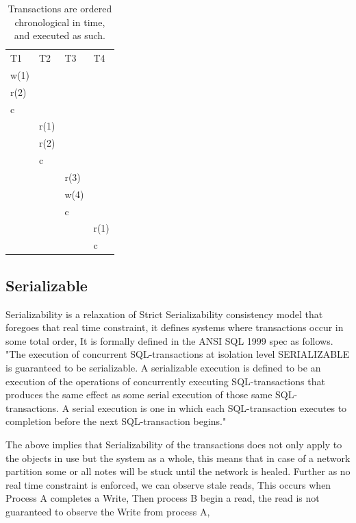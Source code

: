 \documentclass[a4paper,10pt,titlepage]{report}
\begin{document}
\begin{table}[h]
\begin{tabular}{l|l|l|l}
T1   & T2   & T3   & T4   \\
w(1) &      &      &      \\
r(2) &      &      &      \\
c    &      &      &      \\
     & r(1) &      &      \\
     & r(2) &      &      \\
     & c    &      &      \\
     &      & r(3) &      \\
     &      & w(4) &      \\
     &      & c    &      \\
     &      &      & r(1) \\
     &      &      & c   
\end{tabular}
\caption{Transactions are ordered chronological in time, and executed as such.}

\end{table}

\subsection{Serializable}

Serializability is a relaxation of Strict Serializability consistency model that foregoes that real time constraint, it defines systems where transactions occur in some total order, It is formally defined in the ANSI SQL 1999 spec as follows. "The execution of concurrent SQL-transactions at isolation level SERIALIZABLE is guaranteed to be serializable. A serializable execution is defined to be an execution of the operations of concurrently executing SQL-transactions that produces the same effect as some serial execution of those same SQL-transactions. A serial execution is one in which each SQL-transaction executes to completion before the next SQL-transaction begins." \cite{ansisql1999}\\
\vspace{5mm}

The above implies that Serializability of the transactions does not only apply to the objects in use but the system as a whole, this means that in case of a network partition some or all notes will be stuck until the network is healed. Further as no real time constraint is enforced,  we can observe stale reads, This occurs when Process A completes a Write, Then process B begin a read, the read is not guaranteed to observe the Write from process A, 
\end{document}

